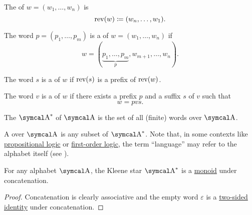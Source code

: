 \begin{definition}
\begin{DefEnum}
     The  of \( w = (w_1, \ldots, w_n) \) is
    \begin{equation*}
      \operatorname{rev}(w) \coloneqq (w_n, \ldots, w_1).
    \end{equation*}

     The word \( p = (p_1, \ldots, p_m) \) is a  of \( w = (w_1, \ldots, w_n) \) if
    \begin{equation*}
      w = (\underbrace{p_1, \ldots, p_m}_p, w_{m+1}, \ldots, w_n).
    \end{equation*}

     The word \( s \) is a  of \( w \) if \( \operatorname{rev}(s) \) is a prefix of \( \operatorname{rev}(w) \).

     The word \( v \) is a  of \( w \) if there exists a prefix \( p \) and a suffix \( s \) of \( v \) such that
    \begin{equation*}
      w = pvs.
    \end{equation*}

     The  \( \CA^{\ast} \) of \( \CA \) is the set of all (finite) words over \( \CA \).

     A  over \( \CA \) is any subset of \( \CA^{\ast} \). Note that, in some contexts like \hyperref[subsec:language_of_propositional_logic]{propositional logic} or \hyperref[subsec:language_of_first_order_logic]{first-order logic}, the term \enquote{language} may refer to the alphabet itself (see ).
  \end{DefEnum}
\end{definition}

\begin{proposition}\label{thm:kleene_star_is_monoid}
  For any alphabet \( \CA \), the Kleene star \( \CA^{\ast} \) is a \hyperref[def:unital_magma/associative]{monoid} under concatenation.
\end{proposition}
\begin{proof}
  Concatenation is clearly associative and the empty word \( \varepsilon \) is a \hyperref[def:magma_identity]{two-sided identity} under concatenation.
\end{proof}

